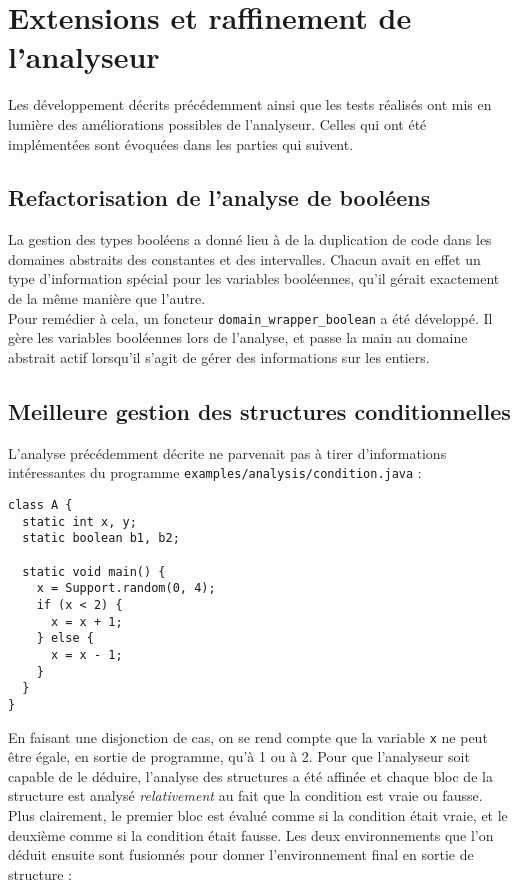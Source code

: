 \documentclass[paper=a4, fontsize=11pt]{scrartcl}
\numberwithin{figure}{section}			%
\numberwithin{table}{section}				%
\begin{document}
\section{Extensions et raffinement de l'analyseur}

Les développement décrits précédemment ainsi que les tests réalisés ont mis en lumière des améliorations possibles de l'analyseur. Celles qui ont été implémentées sont évoquées dans les parties qui suivent.

\subsection{Refactorisation de l'analyse de booléens}

La gestion des types booléens a donné lieu à de la duplication de code dans les domaines abstraits des constantes et des intervalles. Chacun avait en effet un type d'information spécial pour les variables booléennes, qu'il gérait exactement de la même manière que l'autre.\\

Pour remédier à cela, un foncteur \texttt{domain\_wrapper\_boolean} a été développé. Il gère les variables booléennes lors de l'analyse, et passe la main au domaine abstrait actif lorsqu'il s'agit de gérer des informations sur les entiers.

\subsection{Meilleure gestion des structures conditionnelles}

L'analyse précédemment décrite ne parvenait pas à tirer d'informations intéressantes du programme \texttt{examples/analysis/condition.java} :

\begin{verbatim}
class A {
  static int x, y;
  static boolean b1, b2;

  static void main() {
    x = Support.random(0, 4);
    if (x < 2) {
      x = x + 1;
    } else {
      x = x - 1;
    }
  }
}
\end{verbatim}

En faisant une disjonction de cas, on se rend compte que la variable \texttt{x} ne peut être égale, en sortie de programme, qu'à 1 ou à 2. Pour que l'analyseur soit capable de le déduire, l'analyse des structures a été affinée et chaque bloc de la structure est analysé \textit{relativement} au fait que la condition est vraie ou fausse. Plus clairement, le premier bloc est évalué comme si la condition était vraie, et le deuxième comme si la condition était fausse. Les deux environnements que l'on déduit ensuite sont fusionnés pour donner l'environnement final en sortie de structure :
\end{document}

